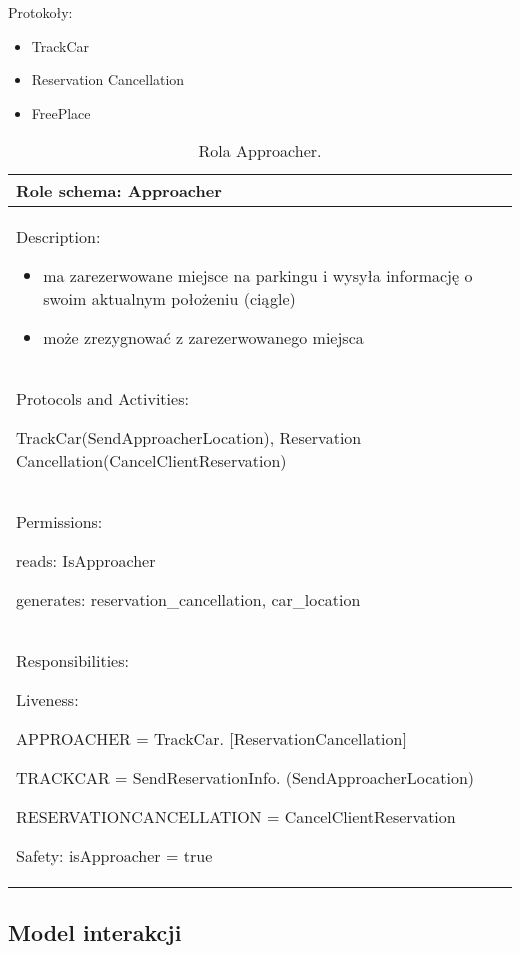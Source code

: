Protokoły:
\begin{itemize}
    \item TrackCar
    \item Reservation Cancellation
    \item FreePlace
\end{itemize}


\begin{table}[!h] \label{tab:rola1} \centering
    \caption{Rola Approacher.}
    \begin{tabular} {| p{14cm} |} \hline
        Role schema: Approacher \\ \hline
        Description:

        \begin{itemize}
            \item ma zarezerwowane miejsce na parkingu i wysyła informację o swoim aktualnym położeniu (ciągle)
            \item może zrezygnować z zarezerwowanego miejsca
            
        \end{itemize} \\ \hline
        Protocols and Activities: 
        
        TrackCar(SendApproacherLocation), Reservation Cancellation(CancelClientReservation) \\ \hline
        Permissions:

        reads: IsApproacher

        generates:  reservation\_cancellation, car\_location \\ \hline
        Responsibilities:

        Liveness: 
        
        APPROACHER = TrackCar. [ReservationCancellation]
        
        TRACKCAR = SendReservationInfo. (SendApproacherLocation)

        RESERVATIONCANCELLATION = CancelClientReservation

        

        Safety: isApproacher = true \\ \hline
    \end{tabular}
\end{table}


\newpage
\subsection{Model interakcji}

